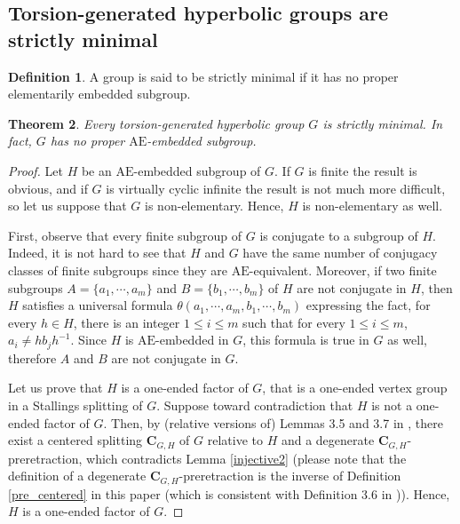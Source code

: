 \documentclass[a4paper, 11pt]{amsart}
\newtheorem{te}{Theorem}[section]
\theoremstyle{definition}
\newtheorem{de}[te]{Definition}
\theoremstyle{remark}
\renewcommand{\leq}{\leqslant}
\begin{document}
\subsection{Torsion-generated hyperbolic groups are strictly minimal}\label{strictly_minimal}

\begin{de}\label{strictly_minimal_def}A group is said to be strictly minimal if it has no proper elementarily embedded subgroup.\end{de}

\begin{te}\label{strictly_minimal_theorem}Every torsion-generated hyperbolic group $G$ is strictly minimal. In fact, $G$ has no proper $\mathrm{AE}$-embedded subgroup.\end{te}

\begin{proof}Let $H$ be an $\mathrm{AE}$-embedded subgroup of $G$. If $G$ is finite the result is obvious, and if $G$ is virtually cyclic infinite the result is not much more difficult, so let us suppose that $G$ is non-elementary. Hence, $H$ is non-elementary as well. 

\smallskip \noindent
First, observe that every finite subgroup of $G$ is conjugate to a subgroup of $H$. Indeed, it is not hard to see that $H$ and $G$ have the same number of conjugacy classes of finite subgroups since they are $\mathrm{AE}$-equivalent. Moreover, if two finite subgroups $A = \lbrace a_1,\cdots, a_m\rbrace$ and $B = \lbrace b_1,\cdots, b_m\rbrace$ of $H$ are not conjugate in $H$, then $H$ satisfies a universal formula $\theta(a_1,\cdots, a_m, b_1,\cdots, b_m)$ expressing the fact, for every $h\in H$, there is an integer $1\leq i\leq m$ such that for every $1\leq i\leq m$, $a_i\neq hb_jh^{-1}$. Since $H$ is $\mathrm{AE}$-embedded in $G$, this formula is true in $G$ as well, therefore $A$ and $B$ are not conjugate in $G$.

\smallskip \noindent
Let us prove that $H$ is a one-ended factor of $G$, that is a one-ended vertex group in a Stallings splitting of $G$. Suppose toward contradiction that $H$ is not a one-ended factor of $G$. Then, by (relative versions of) Lemmas 3.5 and 3.7 in \cite{And21b}, there exist a centered splitting $\mathbf{C}_{G,H}$ of $G$ relative to $H$ and a degenerate $\mathbf{C}_{G,H}$-preretraction, which contradicts Lemma \ref{injective2} (please note that the definition of a degenerate $\mathbf{C}_{G,H}$-preretraction \cite[Definition 2.27]{And21b} is the inverse of Definition \ref{pre_centered} in this paper (which is consistent with Definition 3.6 in \cite{And18})). Hence, $H$ is a one-ended factor of $G$. 


\end{proof}
\end{document}
